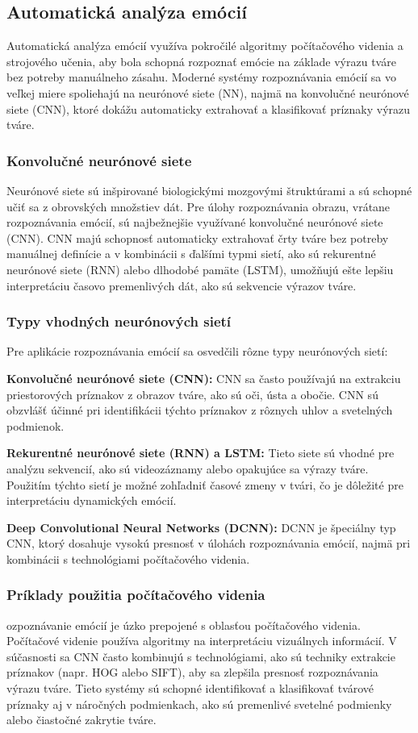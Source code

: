 \subsection{Automatická analýza emócií}
Automatická analýza emócií využíva pokročilé algoritmy počítačového videnia a strojového učenia, aby bola schopná rozpoznať emócie na základe výrazu tváre bez potreby manuálneho zásahu. 
Moderné systémy rozpoznávania emócií sa vo veľkej miere spoliehajú na neurónové siete (NN), najmä na konvolučné neurónové siete (CNN), ktoré dokážu automaticky extrahovať a klasifikovať príznaky výrazu tváre.

\subsubsection{Konvolučné neurónové siete}
Neurónové siete sú inšpirované biologickými mozgovými štruktúrami a sú schopné učiť sa z obrovských množstiev dát. Pre úlohy rozpoznávania obrazu, vrátane rozpoznávania emócií, 
sú najbežnejšie využívané konvolučné neurónové siete (CNN)​. CNN majú schopnosť automaticky extrahovať črty tváre bez potreby manuálnej definície a v kombinácii s ďalšími typmi sietí,
ako sú rekurentné neurónové siete (RNN) alebo dlhodobé pamäte (LSTM), umožňujú ešte lepšiu interpretáciu časovo premenlivých dát, ako sú sekvencie výrazov tváre. \cite{article01} \cite{misc01}

\subsubsection{Typy vhodných neurónových sietí}
Pre aplikácie rozpoznávania emócií sa osvedčili rôzne typy neurónových sietí:

\textbf{Konvolučné neurónové siete (CNN):} CNN sa často používajú na extrakciu priestorových príznakov z obrazov tváre, ako sú oči, ústa a obočie​. CNN sú obzvlášť účinné pri identifikácii týchto príznakov 
z rôznych uhlov a svetelných podmienok. \cite{article05}

\textbf{Rekurentné neurónové siete (RNN) a LSTM: }Tieto siete sú vhodné pre analýzu sekvencií, ako sú videozáznamy alebo opakujúce sa výrazy tváre. Použitím týchto sietí je možné zohľadniť časové zmeny v tvári,
 čo je dôležité pre interpretáciu dynamických emócií​. \cite{article02}

\textbf{Deep Convolutional Neural Networks (DCNN): } DCNN je špeciálny typ CNN, ktorý dosahuje vysokú presnosť v úlohách rozpoznávania emócií, najmä pri kombinácii s technológiami počítačového videnia.
\subsubsection{Príklady použitia počítačového videnia}
ozpoznávanie emócií je úzko prepojené s oblasťou počítačového videnia. Počítačové videnie používa algoritmy na interpretáciu vizuálnych informácií. V súčasnosti sa CNN často kombinujú s technológiami, 
ako sú techniky extrakcie príznakov (napr. HOG alebo SIFT), aby sa zlepšila presnosť rozpoznávania výrazu tváre. Tieto systémy sú schopné identifikovať a klasifikovať tvárové príznaky aj v náročných podmienkach,
 ako sú premenlivé svetelné podmienky alebo čiastočné zakrytie tváre.\cite{Huang2023}



